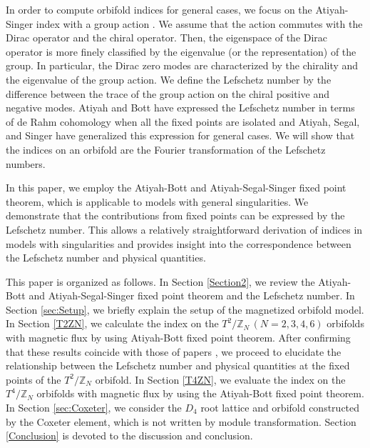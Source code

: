 \documentclass[11pt]{article}
\newcommand{\Lef}{Lefschetz }
\begin{document}
In order to compute orbifold indices for general cases, we focus on the Atiyah-Singer index with a group action \cite{atiyah1967lefschetz,Atiyah1968TheIndex, berline1985computation,bismut1985infinitesimal,bismut1986localization}.
We assume that the action commutes with the Dirac operator and the chiral operator. Then, the eigenspace of the Dirac operator is more finely classified by the eigenvalue (or the representation) of the group. In particular, the Dirac zero modes are characterized by the chirality and the eigenvalue of the group action. We define the \Lef number by
the difference between the trace of the group action on the chiral positive and negative modes. Atiyah and Bott \cite{atiyah1967lefschetz} have expressed the \Lef number in terms of de Rahm cohomology when all the fixed points are isolated and Atiyah, Segal, and Singer \cite{Atiyah1968TheIndex} have generalized this expression for general cases. 
We will show that the indices on an orbifold are the Fourier transformation of the Lefschetz numbers.

In this paper, we employ the Atiyah-Bott and Atiyah-Segal-Singer fixed point theorem, which is applicable to models with general singularities. We demonstrate that the contributions from fixed points can be expressed by the Lefschetz number. This allows a relatively straightforward derivation of indices in models with singularities and provides insight into the correspondence between the Lefschetz number and physical quantities.

This paper is organized as follows. In Section \ref{Section2}, we review the Atiyah-Bott and Atiyah-Segal-Singer fixed point theorem and the \Lef number. In Section \ref{sec:Setup}, we briefly explain the setup of the magnetized orbifold model. In Section \ref{T2ZN}, we calculate the index on the $T^2/{\mathbb{Z}}_N\,(N=2,3,4,6)$ orbifolds with magnetic flux by using Atiyah-Bott fixed point theorem. 
After confirming that these results coincide with those of papers \cite{Sakamoto:2020pev,Kobayashi:2022tti,Imai:2022bke}, we proceed to elucidate the relationship between the Lefschetz number and physical quantities at the fixed points of the $T^2/{\mathbb{Z}}_N$ orbifold.
In Section \ref{T4ZN}, we evaluate the index on the $T^4/{\mathbb{Z}}_N$ orbifolds with magnetic flux by using the Atiyah-Bott fixed point theorem. In Section \ref{sec:Coxeter}, we consider the $D_4$ root lattice and orbifold constructed by the Coxeter element, which is not written by module transformation. Section \ref{Conclusion} is devoted to the discussion and conclusion. 
\end{document}
